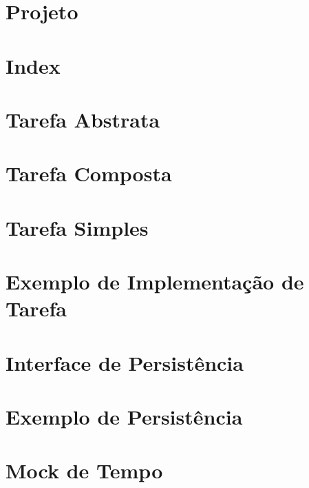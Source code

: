 \documentclass[12pt]{tcc}
\begin{document}
\section{Projeto}


\section{Index}


\section{Tarefa Abstrata}


\section{Tarefa Composta}


\section{Tarefa Simples}


\section{Exemplo de Implementação de Tarefa}


\section{Interface de Persistência}


\section{Exemplo de Persistência}


\section{Mock de Tempo}

\end{document}
